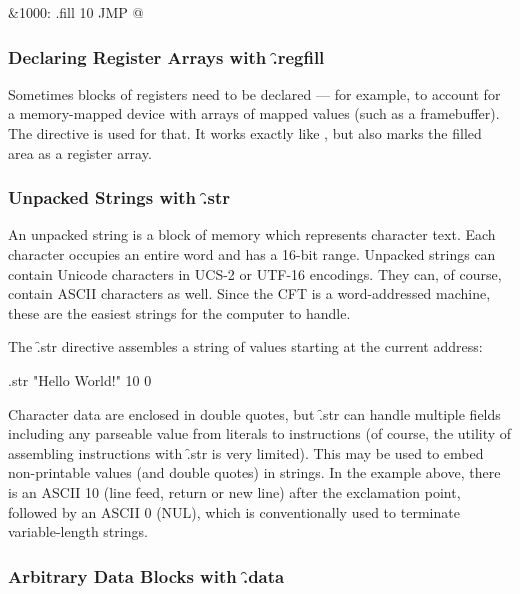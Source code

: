 \begin{cftasmcode}
&1000:  .fill 10 JMP @
\end{cftasmcode}



\subsubsection{Declaring Register Arrays with \f{.regfill}}

Sometimes blocks of registers need to be declared — for example, to account for
a memory-mapped device with arrays of mapped values (such as a
framebuffer). The  directive is used for that. It works exactly
like , but also marks the filled area as a register array.



\subsubsection{Unpacked Strings with \f{.str}}

An unpacked string is a block of memory which represents character text. Each
character occupies an entire word and has a 16-bit range. Unpacked strings can
contain Unicode characters in UCS-2 or UTF-16 encodings. They can, of course,
contain ASCII characters as well. Since the CFT is a word-addressed machine,
these are the easiest strings for the computer to handle.

The \f{.str} directive assembles a string of values starting at the current
address:

\begin{cftasmcode}
.str "Hello World!" 10 0
\end{cftasmcode}

Character data are enclosed in double quotes, but \f{.str} can handle multiple
fields including any parseable value from literals to instructions (of course,
the utility of assembling instructions with \f{.str} is very limited). This may
be used to embed non-printable values (and double quotes) in strings. In the
example above, there is an ASCII 10 (line feed, return or new line) after the
exclamation point, followed by an ASCII 0 (NUL), which is conventionally used
to terminate variable-length strings.

\subsubsection{Arbitrary Data Blocks with \f{.data}}

